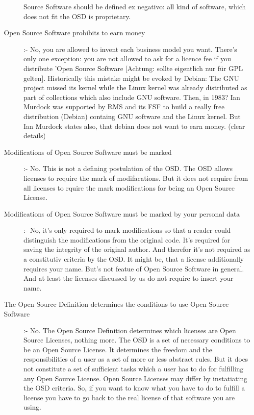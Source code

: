 \begin{description}
  Source Software should be defined ex negativo: all kind of software, which
  does not fit the OSD is proprietary.
  \item[Open Source Software prohibits to earn money] :- No,
  you are allowed to invent each business model you want. There's only one
  exception: you are not allowed to ask for a licence fee if you distribute
  'Open Source Software [Achtung: sollte eigentlich nur für GPL gelten].
  Historically this mistake might be evoked by Debian: The GNU project missed
  its kernel while the Linux kernel was already distributed as part of
  collections which also include GNU software. Then, in 1983? Ian Murdock was
  supported by RMS and its FSF to build a really free distribution (Debian)
  containg GNU software and the Linux kernel. But Ian Murdock states also, that
  debian does not want to earn money. (clear details)
  
  \item[Modifications of Open Source Software must be marked] :- No. This is not
  a defining postulation of the OSD. The OSD allows licenses to require the mark
  of modifacations. But it does not require from all licenses to rquire the mark
  modifications for being an Open Source License.
  
  \item[Modifications of Open Source Software must be marked by your personal
  data] :- No, it's only required to mark modifications so that a reader could
  distinguish the modifications from the original code. It's required for saving
  the integrity of the original author. And therefor it's not required as a
  constitutiv criteria by the OSD. It might be, that a license additionally
  requires your name. But's not featue of Open Source Software in general. And
  at least the licenses discussed by us do not require to insert your name.
  
  \item[The Open Source Definition determines the conditions to use Open Source
  Software] :- No. The Open Source Definition determines which licenses are Open
  Source Licenses, nothing more. The OSD is a set of necessary conditions to be
  an Open Source License. It determines the freedom and the responsibilities of
  a user as a set of more or less abstract rules. But it does not constitute a
  set of sufficient tasks which a user has to do for fulfilling any Open Source
  License. Open Source Licenses may differ by instatiating the OSD criteria.
  So, if you want to know what you have to do to fulfill a license you have to
  go back to the real license of that software you are using.
\end{description}

%
